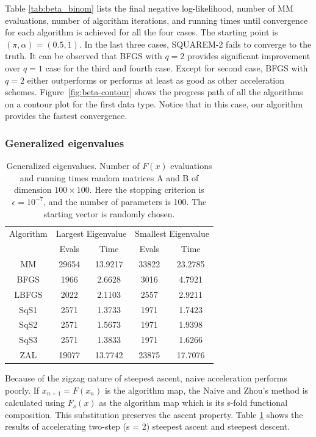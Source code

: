 \documentclass[12pt]{article}
\begin{document}
Table \ref{tab:beta_binom} lists the final negative log-likelihood, number of MM evaluations, number of algorithm iterations, and running times until convergence for each algorithm is achieved for all the four cases. The starting point is $(\pi,\alpha) = (0.5, 1)$. In the last three cases, SQUAREM-2 fails to converge to the truth. It can be observed that BFGS with $q=2$ provides significant improvement over $q=1$ case for the third and fourth case. Except for second case, BFGS with $q=2$ either outperforms or performs at least as good as other acceleration schemes. Figure~\ref{fig:beta-contour} shows the progress path of all the algorithms on a contour plot for the first data type. Notice that in this case, our algorithm provides the fastest convergence.



\subsubsection{Generalized eigenvalues} \label{ex:gen.eigen}
\begin{table}[!htbp]
\centering
\begin{tabular}{c c c c c} 
 \hline
 Algorithm & \multicolumn{2}{c}{Largest Eigenvalue} & \multicolumn{2}{c}{Smallest Eigenvalue} \\ [0.5ex] 
 & Evals & Time & Evals & Time\\ [0.5ex]
 \hline
MM  & 29654 & 13.9217 & 33822 & 23.2785\\ 
BFGS & 1966 & 2.6628 & 3016 & 4.7921 \\
LBFGS & 2022 & 2.1103 & 2557 &  2.9211 \\
SqS1 & 2571 & 1.3733 & 1971 & 1.7423 \\
SqS2 & 2571 & 1.5673 & 1971 & 1.9398 \\
SqS3 & 2571 & 1.3833 & 1971 & 1.6266 \\
ZAL & 19077 & 13.7742 & 23875 & 17.7076\\ [1ex] 
 \hline
\end{tabular}
\caption{Generalized eigenvalues. Number of $F(x)$ evaluations and running times random matrices A and B of dimension $100 \times 100$. Here the stopping criterion is $\epsilon = 10^{-7}$, and the number of parameters
is 100. The starting vector is randomly chosen.}
\label{tab:gen_eigen}
\end{table}
Because of the zigzag nature of steepest ascent, naive acceleration performs poorly. If $x_{n+1} = F(x_n)$ is the algorithm
map, the Naive and Zhou's method is calculated using $F_s(x)$ as the algorithm map which is its s-fold functional composition. This substitution preserves the ascent property. Table \ref{tab:gen_eigen} shows the
results of accelerating two-step (s = 2) steepest ascent and
steepest descent. \\
\end{document}
